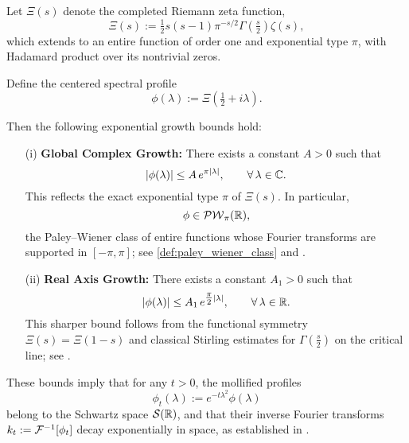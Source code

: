 \begin{lemma}
\label{lem:xi_growth_bound}
Let \( \Xi(s) \) denote the completed Riemann zeta function,
\[
\Xi(s) := \tfrac{1}{2} s(s-1) \pi^{-s/2} \Gamma\left(\tfrac{s}{2}\right) \zeta(s),
\]
which extends to an entire function of order one and exponential type \( \pi \), with Hadamard product over its nontrivial zeros.

Define the centered spectral profile
\[
\phi(\lambda) := \Xi\left( \tfrac{1}{2} + i\lambda \right).
\]

Then the following exponential growth bounds hold:
\begin{itemize}
    \item[\textup{(i)}] \textbf{Global Complex Growth:} There exists a constant \( A > 0 \) such that
    \[
    |\phi(\lambda)| \le A\, e^{\pi |\lambda|}, \qquad \forall\, \lambda \in \mathbb{C}.
    \]
    This reflects the exact exponential type \( \pi \) of \( \Xi(s) \). In particular,
    \[
    \phi \in \mathcal{PW}_{\pi}(\mathbb{R}),
    \]
    the Paley--Wiener class of entire functions whose Fourier transforms are supported in \( [-\pi, \pi] \); see \cref{def:paley_wiener_class} and \cite[Thm.~3.7.1]{Levin1996EntireLectures}.

    \item[\textup{(ii)}] \textbf{Real Axis Growth:} There exists a constant \( A_1 > 0 \) such that
    \[
    |\phi(\lambda)| \le A_1\, e^{\tfrac{\pi}{2} |\lambda|}, \qquad \forall\, \lambda \in \mathbb{R}.
    \]
    This sharper bound follows from the functional symmetry \( \Xi(s) = \Xi(1 - s) \) and classical Stirling estimates for \( \Gamma\left(\tfrac{s}{2}\right) \) on the critical line; see \cite[§4.12]{Titchmarsh1986Zeta}.
\end{itemize}

\medskip
\noindent
These bounds imply that for any \( t > 0 \), the mollified profiles
\[
\phi_t(\lambda) := e^{-t\lambda^2} \phi(\lambda)
\]
belong to the Schwartz space \( \mathcal{S}(\mathbb{R}) \), and that their inverse Fourier transforms \( k_t := \mathcal{F}^{-1}[\phi_t] \) decay exponentially in space, as established in .
\end{lemma}
